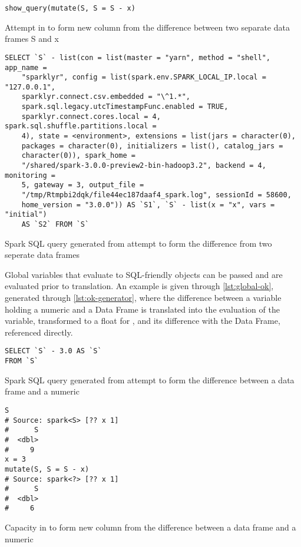 \begin{listing}
	\begin{verbatim}
show_query(mutate(S, S = S - x)
\end{verbatim}
	\caption{Attempt in \R to form new column from the difference between two separate  data frames S and x}
	\label{lst:bad}
\end{listing}

\begin{listing}
	\begin{verbatim}
SELECT `S` - list(con = list(master = "yarn", method = "shell", app_name =
	"sparklyr", config = list(spark.env.SPARK_LOCAL_IP.local = "127.0.0.1",
	sparklyr.connect.csv.embedded = "\^1.*",
	spark.sql.legacy.utcTimestampFunc.enabled = TRUE,
	sparklyr.connect.cores.local = 4, spark.sql.shuffle.partitions.local =
	4), state = <environment>, extensions = list(jars = character(0),
	packages = character(0), initializers = list(), catalog_jars =
	character(0)), spark_home =
	"/shared/spark-3.0.0-preview2-bin-hadoop3.2", backend = 4, monitoring =
	5, gateway = 3, output_file =
	"/tmp/Rtmpbi2dqk/file44ec187daaf4_spark.log", sessionId = 58600,
	home_version = "3.0.0")) AS `S1`, `S` - list(x = "x", vars = "initial")
	AS `S2` FROM `S`
\end{verbatim}
	\caption{Spark SQL query generated from attempt to form the difference from two seperate data frames}
	\label{lst:computer-no}
\end{listing}

Global variables that evaluate to SQL-friendly objects can be passed and
are evaluated prior to translation. An example is given through
\cref{lst:global-ok}, generated through \cref{lst:ok-generator}, where
the difference between a variable holding a numeric and a  Data
Frame is translated into the evaluation of the variable, transformed to
a float for , and its difference with the  Data Frame,
referenced directly.

\begin{listing}
	\begin{verbatim}
SELECT `S` - 3.0 AS `S`
FROM `S`
\end{verbatim}
	\caption{Spark SQL query generated from attempt to form the difference between a data frame and a numeric}
	\label{lst:global-ok}
\end{listing}

\begin{listing}
	\begin{verbatim}
S
# Source: spark<S> [?? x 1]
#      S
#  <dbl>
#     9
x = 3
mutate(S, S = S - x)
# Source: spark<?> [?? x 1]
#      S
#  <dbl>
#     6
\end{verbatim}
	\caption{Capacity in  to form new column from the difference between a  data frame and a numeric}
	\label{lst:ok-generator}
\end{listing}

